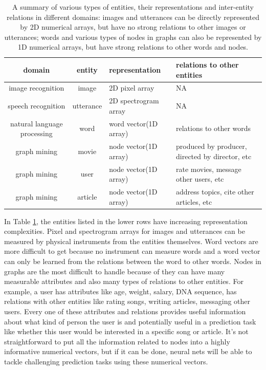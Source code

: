 \documentclass{article}
\begin{document}
\begin{table}
	\centering
	\begin{tabularx}{\textwidth}{ |c|c|X|X| }
		\hline domain & entity & representation & relations to other entities \\ 
		\hline image recognition & image & 2D pixel array & NA \\ 
		\hline speech recognition & utterance & 2D spectrogram array & NA \\ 
		\hline natural language processing & word & word vector(1D array) & relations to other words \\ 
		\hline graph mining & movie & node vector(1D array) & produced by producer, directed by director, etc \\ 
		\hline graph mining & user & node vector(1D array) & rate movies, message other users, etc \\ 
		\hline graph mining & article & node vector(1D array) & address topics, cite other articles, etc \\
		\hline
	\end{tabularx}
	\caption{A summary of various types of entities, their representations and inter-entity relations in different domains: images and utterances can be directly represented by 2D numerical arrays, but have no strong relations to other images or utterances; words and various types of nodes in graphs can also be represented by 1D numerical arrays, but have strong relations to other words and nodes.}
	\label{tab:domains}
\end{table}

In Table \ref{tab:domains}, the entities listed in the lower rows have increasing representation complexities. Pixel and spectrogram arrays for images and utterances can be measured by physical instruments from the entities themselves. Word vectors are more difficult to get because no instrument can measure words and a word vector can only be learned from the relations between the word to other words. Nodes in graphs are the most difficult to handle because of they can have many measurable attributes and also many types of relations to other entities. For example, a user has attributes like age, weight, salary, DNA sequence, has relations with other entities like rating songs, writing articles, messaging other users. Every one of these attributes and relations provides useful information about what kind of person the user is and potentially useful in a prediction task like whether this user would be interested in a specific song or article. It's not straightforward to put all the information related to nodes into a highly informative numerical vectors, but if it can be done, neural nets will be able to tackle challenging prediction tasks using these numerical vectors.
\end{document}
